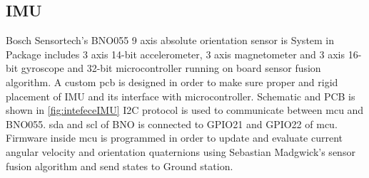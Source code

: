 \subsection{IMU}
Bosch Sensortech's BNO055 9 axis absolute orientation sensor is System in Package includes 3 axis 14-bit accelerometer, 3 axis magnetometer and 3 axis 16-bit gyroscope  and 32-bit microcontroller running on board sensor fusion algorithm.\cite{web:ds_BNO055}
\noindent A custom  \acrshort{pcb} is designed in order to make sure proper and rigid placement of IMU and its interface with microcontroller. Schematic and PCB is shown in \autoref{fig:intefeceIMU} I2C protocol is used to communicate between \acrfull{mcu} and BNO055. \acrshort{sda} and \acrshort{scl} of BNO is connected to GPIO21 and GPIO22 of \acrshort{mcu}. Firmware inside \acrshort{mcu} is programmed in order to update and evaluate current angular velocity and orientation quaternions using Sebastian Madgwick's sensor fusion algorithm \cite{madgwick2010efficient} and send states to Ground station.

